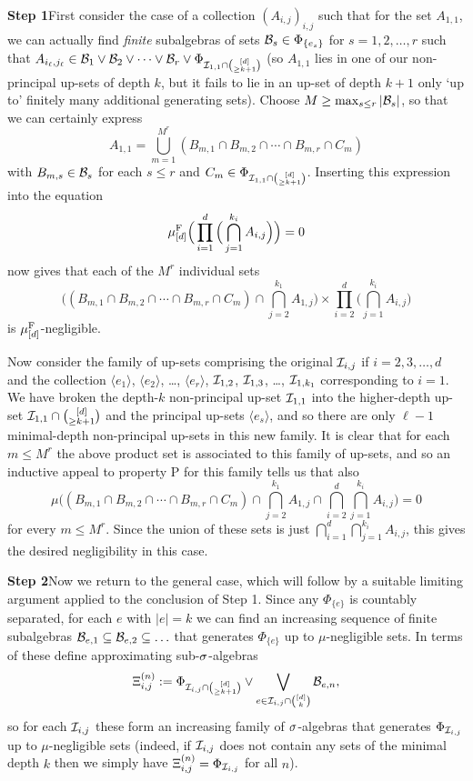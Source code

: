\documentclass[12pt]{article}
\begin{document}
\textbf{Step 1}\quad First consider the case of a collection
$(A_{i,j})_{i,j}$ such that for the set $A_{1,1}$, we can actually
find \emph{finite} subalgebras of sets $\B_s\in \Phi_{\{e_s\}}$ for
$s = 1,2,\ldots,r$ such that $A_{i_\ell,j_\ell} \in \B_1\vee
\B_2\vee \cdots \vee \B_r\vee\Phi_{\I_{1,1}\cap\binom{[d]}{\geq
k+1}}$ (so $A_{1,1}$ lies in one of our non-principal up-sets of
depth $k$, but it fails to lie in an up-set of depth $k+1$ only `up
to' finitely many additional generating sets). Choose $M\geq
\max_{s\leq r}|\B_s|$, so that we can certainly express
\[A_{1,1} = \bigcup_{m=1}^{M^r} (B_{m,1}\cap B_{m,2}\cap\cdots\cap B_{m,r}\cap C_m)\]
with $B_{m,s}\in \B_s$ for each $s\leq r$ and $C_m \in
\Phi_{\I_{1,1}\cap\binom{[d]}{\geq k+1}}$.  Inserting this
expression into the equation
\[\mu^{\rm{F}}_{[d]}\Big(\prod_{i=1}^d\Big(\bigcap_{j=1}^{k_i}A_{i,j}\Big)\Big)
= 0\] now gives that each of the $M^r$ individual sets
\[\Big((B_{m,1}\cap B_{m,2}\cap\cdots\cap B_{m,r}\cap C_m)\cap \bigcap_{j=2}^{k_1}A_{1,j}\Big)\times\prod_{i=2}^d \Big(\bigcap_{j=1}^{k_i}A_{i,j}\Big)\]
is $\mu^{\rm{F}}_{[d]}$-negligible.

Now consider the family of up-sets comprising the original
$\I_{i,j}$ if $i=2,3,\ldots,d$ and the collection $\langle
e_1\rangle$, $\langle e_2\rangle$, \ldots, $\langle e_r\rangle$,
$\I_{1,2}$, $\I_{1,3}$, \ldots, $\I_{1,k_1}$ corresponding to $i =
1$. We have broken the depth-$k$ non-principal up-set $\I_{1,1}$
into the higher-depth up-set $\I_{1,1}\cap\binom{[d]}{\geq k+1}$ and
the principal up-sets $\langle e_s\rangle$, and so there are only
$\ell-1$ minimal-depth non-principal up-sets in this new family.  It
is clear that for each $m\leq M^r$ the above product set is
associated to this family of up-sets, and so an inductive appeal to
property P for this family tells us that also
\[\mu\Big((B_{m,1}\cap B_{m,2}\cap\cdots\cap B_{m,r}\cap C_m)\cap \bigcap_{j=2}^{k_1}A_{1,j}\cap \bigcap_{i=2}^d \bigcap_{j=1}^{k_i}A_{i,j}\Big) = 0\]
for every $m\leq M^r$.  Since the union of these sets is just
$\bigcap_{i=1}^d\bigcap_{j=1}^{k_i} A_{i,j}$, this gives the desired
negligibility in this case.

\textbf{Step 2}\quad Now we return to the general case, which will
follow by a suitable limiting argument applied to the conclusion of
Step 1.  Since any $\Phi_{\{e\}}$ is countably separated, for each
$e$ with $|e| = k$ we can find an increasing sequence of finite
subalgebras $\B_{e,1} \subseteq \B_{e,2} \subseteq\ldots$ that
generates $\Phi_{\{e\}}$ up to $\mu$-negligible sets. In terms of
these define approximating sub-$\s$-algebras
\[\Xi^{(n)}_{i,j} := \Phi_{\I_{i,j}\cap \binom{[d]}{\geq k+1}}\vee \bigvee_{e \in \I_{i,j}\cap \binom{[d]}{k}} \B_{e,n},\]
so for each $\I_{i,j}$ these form an increasing family of
$\s$-algebras that generates $\Phi_{\I_{i,j}}$ up to
$\mu$-negligible sets (indeed, if $\I_{i,j}$ does not contain any
sets of the minimal depth $k$ then we simply have $\Xi^{(n)}_{i,j} =
\Phi_{\I_{i,j}}$ for all $n$).
\end{document}

